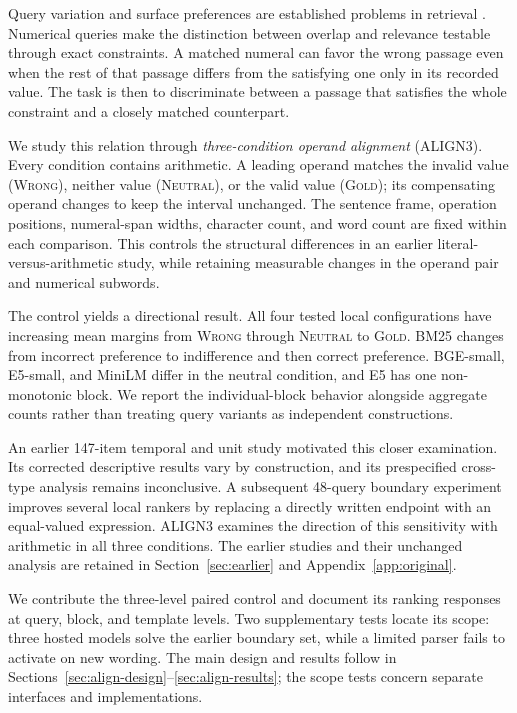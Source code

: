 \documentclass[conference,letterpaper]{IEEEtran}
\newcommand{\wrong}{\textsc{Wrong}}
\newcommand{\neutral}{\textsc{Neutral}}
\newcommand{\gold}{\textsc{Gold}}
\begin{document}
Query variation and surface preferences are established problems in retrieval \cite{hagen-etal-2024-revisiting,campese-etal-2025-improving,fayyaz-etal-2025-collapse}. Numerical queries make the distinction between overlap and relevance testable through exact constraints. A matched numeral can favor the wrong passage even when the rest of that passage differs from the satisfying one only in its recorded value. The task is then to discriminate between a passage that satisfies the whole constraint and a closely matched counterpart.

We study this relation through \emph{three-condition operand alignment} (ALIGN3). Every condition contains arithmetic. A leading operand matches the invalid value (\wrong), neither value (\neutral), or the valid value (\gold); its compensating operand changes to keep the interval unchanged. The sentence frame, operation positions, numeral-span widths, character count, and word count are fixed within each comparison. This controls the structural differences in an earlier literal-versus-arithmetic study, while retaining measurable changes in the operand pair and numerical subwords.

The control yields a directional result. All four tested local configurations have increasing mean margins from \wrong{} through \neutral{} to \gold. BM25 changes from incorrect preference to indifference and then correct preference. BGE-small, E5-small, and MiniLM differ in the neutral condition, and E5 has one non-monotonic block. We report the individual-block behavior alongside aggregate counts rather than treating query variants as independent constructions.

An earlier 147-item temporal and unit study motivated this closer examination. Its corrected descriptive results vary by construction, and its prespecified cross-type analysis remains inconclusive. A subsequent 48-query boundary experiment improves several local rankers by replacing a directly written endpoint with an equal-valued expression. ALIGN3 examines the direction of this sensitivity with arithmetic in all three conditions. The earlier studies and their unchanged analysis are retained in Section~\ref{sec:earlier} and Appendix~\ref{app:original}.

We contribute the three-level paired control and document its ranking responses at query, block, and template levels. Two supplementary tests locate its scope: three hosted models solve the earlier boundary set, while a limited parser fails to activate on new wording. The main design and results follow in Sections~\ref{sec:align-design}--\ref{sec:align-results}; the scope tests concern separate interfaces and implementations.
\end{document}
